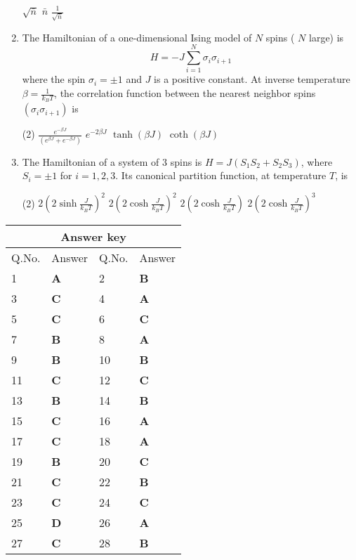 \begin{enumerate}
\begin{tasks}
\task[\textbf{B.}]  $\sqrt{\bar{n}}$
\task[\textbf{C.}] $\bar{n}$
\task[\textbf{D.}] $\frac{1}{\sqrt{\bar{n}}}$
\end{tasks}
 \item The Hamiltonian of a one-dimensional Ising model of $N$ spins ( $N$ large) is
 $$
 H=-J \sum_{i=1}^{N} \sigma_{i} \sigma_{i+1}
 $$
 where the spin $\sigma_{i}=\pm 1$ and $J$ is a positive constant. At inverse temperature $\beta=\frac{1}{k_{B} T}$, the correlation function between the nearest neighbor spins $\left(\sigma_{i} \sigma_{i+1}\right)$ is
{}
\begin{tasks}(2)
\task[\textbf{A.}] $\frac{e^{-\beta J}}{\left(e^{\beta J}+e^{-\beta J}\right)}$
\task[\textbf{B.}] $e^{-2 \beta J}$
\task[\textbf{C.}] $\tanh (\beta J)$
\task[\textbf{D.}] $\operatorname{coth}(\beta J)$
\end{tasks}
 \item  The Hamiltonian of a system of 3 spins is $H=J\left(S_{1} S_{2}+S_{2} S_{3}\right)$, where $S_{i}=\pm 1$ for $i=1,2,3$. Its canonical partition function, at temperature $T$, is
{ }
\begin{tasks}(2)
\task[\textbf{A.}] $2\left(2 \sinh \frac{J}{k_{B} T}\right)^{2}$
\task[\textbf{B.}]  $2\left(2 \cosh \frac{J}{k_{B} T}\right)^{2}$
\task[\textbf{C.}]  $2\left(2 \cosh \frac{J}{k_{B} T}\right)$
\task[\textbf{D.}] $2\left(2 \cosh \frac{J}{k_{B} T}\right)^{3}$
\end{tasks}
\end{enumerate}
\setlength\arrayrulewidth{1pt}
\begin{table}[H]
	\centering
	\begin{tabular}{|p{1.5cm}|p{1.5cm}||p{1.5cm}|p{1.5cm}|}
		\hline
		\multicolumn{4}{|c|}{\textbf{Answer key}}\\\hline\hline
		\rowcolor{ocrel}Q.No.&Answer&Q.No.&Answer\\\hline
		1&\textbf{A} &2&\textbf{B}\\\hline
		3&\textbf{C} &4&\textbf{A} \\\hline
		5&\textbf{C} &6&\textbf{C} \\\hline
		7&\textbf{B}&8&\textbf{A}\\\hline
		9&\textbf{B}&10&\textbf{B}\\\hline
		11&\textbf{C} &12&\textbf{C}\\\hline
		13&\textbf{B}&14&\textbf{B}\\\hline
		15&\textbf{C}&16 &\textbf{A}\\\hline
		17&\textbf{C}&18 &\textbf{A}\\\hline
		19&\textbf{B}&20&\textbf{C}\\\hline
		21&\textbf{C} &22&\textbf{B}\\\hline
		23&\textbf{C}&24&\textbf{C}\\\hline
		25&\textbf{D}&26 &\textbf{A}\\\hline
		27&\textbf{C}&28 &\textbf{B}\\\hline
	\end{tabular}
\end{table}
